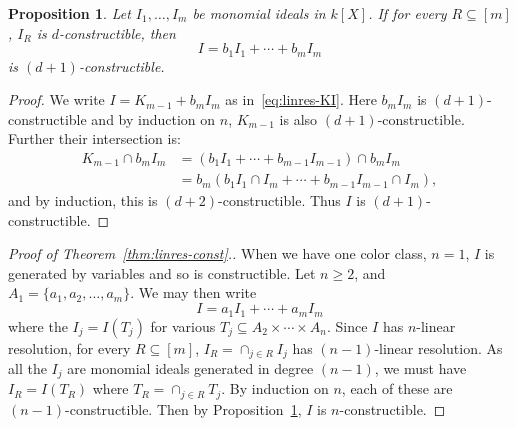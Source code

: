 \documentclass[10pt,a4paper]{article}
\newtheorem{prop}[cdrthm]{Proposition}
\theoremstyle{definition}
\theoremstyle{remark}
\theoremstyle{plain}
\newcommand{\sus}{\subseteq}
\begin{document}
\begin{prop} \label{pro:lin-constr}
  Let $I_1, \ldots, I_m$ be monomial ideals in $k[X]$. If for every
  $R \sus [m]$, $I_R$ is $d$-constructible, then
  \[ I = b_1 I_1 + \cdots + b_m I_m \]
  is $(d+1)$-constructible.
\end{prop}

\begin{proof}
  We write $I = K_{m-1} + b_mI_m$ as in~\eqref{eq:linres-KI}.
  Here $b_m I_m$ is $(d+1)$-constructible
  and by induction on $n$, $K_{m-1}$ is also $(d+1)$-constructible.
  Further their intersection is:
  \begin{align*}  K_{m-1} \cap b_mI_m
    & = (b_1I_1 + \cdots + b_{m-1}I_{m-1}) \cap b_m I_m \\
    & = b_m(b_1I_1 \cap I_m + \cdots + b_{m-1} I_{m-1} \cap I_m),
\end{align*}
  and by induction, this is $(d+2)$-constructible.
  Thus $I$ is $(d+1)$-constructible.
\end{proof}

\begin{proof}[Proof of Theorem~\ref{thm:linres-const}.]
  When we have one color class,  $n = 1$, $I$ is generated by variables and
  so is constructible. Let $n \geq 2$, and $A_1 = \{a_1, a_2, \ldots, a_m \}$.
   We may then write
  \[ I = a_1I_1 + \cdots + a_m I_m \] where the $I_j = I(T_j)$ for
  various $T_j \sus A_2 \times \cdots \times A_n$. Since $I$ has $n$-linear
  resolution, for every $R \sus [m]$, $I_R = \cap_{j \in R} I_j$ has
  $(n-1)$-linear resolution. As all the $I_j$ are monomial ideals
  generated in degree $(n-1)$, we must have $I_R = I(T_R)$ where
  $T_R = \cap_{j \in R} T_j$. By induction on $n$, each of these are
  $(n-1)$-constructible. Then by Proposition~\ref{pro:lin-constr}, $I$ is
  $n$-constructible.
\end{proof}
\end{document}
